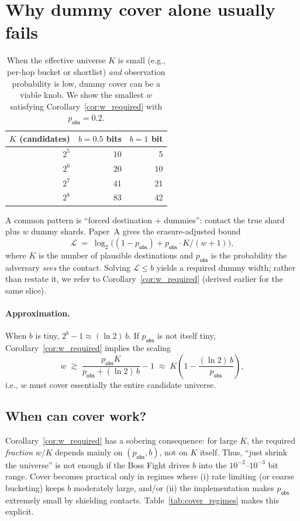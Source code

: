 \documentclass[11pt]{article}
\newcommand{\MaxL}{\mathcal{L}}
\newcommand{\logtwo}{\log_2}
\begin{document}
\section{Why dummy cover alone usually fails}\label{sec:dummyfails}


\begin{table}[t]
\centering
\caption{When the effective universe $K$ is small (e.g., per-hop bucket or shortlist) \emph{and} observation probability is low, dummy cover can be a viable knob. We show the smallest $w$ satisfying Corollary~\ref{cor:w_required} with $p_{\mathsf{obs}}=0.2$.}
\label{tab:bucket-feasible}
\begin{tabular}{r r r}
\toprule
$K$ (candidates) & $b{=}0.5$ bits & $b{=}1$ bit \\
\midrule
$2^{5}$ & 10 & 5 \\
$2^{6}$ & 20 & 10 \\
$2^{7}$ & 41 & 21 \\
$2^{8}$ & 83 & 42 \\
\bottomrule
\end{tabular}
\end{table}

A common pattern is ``forced destination + dummies'': contact the true shard plus $w$ dummy shards.
Paper~A gives the erasure-adjusted bound
\[
\MaxL \;=\; \logtwo\!\Big((1-p_{\mathsf{obs}})+p_{\mathsf{obs}}\cdot K/(w+1)\Big),
\]
where $K$ is the number of plausible destinations and $p_{\mathsf{obs}}$ is the probability the adversary \emph{sees} the contact.
Solving $\MaxL\le b$ yields a required dummy width; rather than restate it, we refer to Corollary~\ref{cor:w_required} (derived earlier for the same slice).

\paragraph{Approximation.}
When $b$ is tiny, $2^b-1\approx (\ln 2)\,b$.
If $p_{\mathsf{obs}}$ is not itself tiny, Corollary~\ref{cor:w_required} implies the scaling
\[
w \;\gtrsim\; \frac{p_{\mathsf{obs}}K}{p_{\mathsf{obs}}+(\ln 2)\,b}-1 \;\approx\; K\left(1-\frac{(\ln 2)\,b}{p_{\mathsf{obs}}}\right),
\]
i.e., $w$ must cover essentially the entire candidate universe.





\subsection{When can cover work?}\label{sec:coverworks}
Corollary~\ref{cor:w_required} has a sobering consequence: for large $K$, the required \emph{fraction} $w/K$ depends mainly on $(p_{\mathsf{obs}},b)$, not on $K$ itself.
Thus, ``just shrink the universe'' is not enough if the Boss Fight drives $b$ into the $10^{-2}$--$10^{-3}$ bit range.
Cover becomes practical only in regimes where (i) rate limiting (or coarse bucketing) keeps $b$ moderately large, and/or (ii) the implementation makes $p_{\mathsf{obs}}$ extremely small by shielding contacts.
Table~\ref{tab:cover_regimes} makes this explicit.
\end{document}
